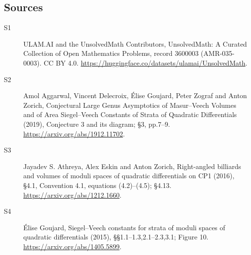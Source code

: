 \documentclass[11pt]{article}
\begin{document}
\subsection{Sources}
\begin{description}
\item[\hypertarget{source:3600003:1}{S1}] ULAM.AI and the UnsolvedMath Contributors, UnsolvedMath: A Curated Collection of Open Mathematics Problems, record 3600003 (AMR-035-0003). CC BY 4.0. \url{https://huggingface.co/datasets/ulamai/UnsolvedMath}.
\item[\hypertarget{source:3600003:2}{S2}] Amol Aggarwal, Vincent Delecroix, Élise Goujard, Peter Zograf and Anton Zorich, Conjectural Large Genus Asymptotics of Masur–Veech Volumes and of Area Siegel–Veech Constants of Strata of Quadratic Differentials (2019), Conjecture 3 and its diagram; §3, pp.7–9. \url{https://arxiv.org/abs/1912.11702}.
\item[\hypertarget{source:3600003:3}{S3}] Jayadev S. Athreya, Alex Eskin and Anton Zorich, Right-angled billiards and volumes of moduli spaces of quadratic differentials on CP1 (2016), §4.1, Convention 4.1, equations (4.2)–(4.5); §4.13. \url{https://arxiv.org/abs/1212.1660}.
\item[\hypertarget{source:3600003:4}{S4}] Élise Goujard, Siegel–Veech constants for strata of moduli spaces of quadratic differentials (2015), §§1.1–1.3,2.1–2.3,3.1; Figure 10. \url{https://arxiv.org/abs/1405.5899}.
\end{description}
\label{end:3600003}
\end{document}
